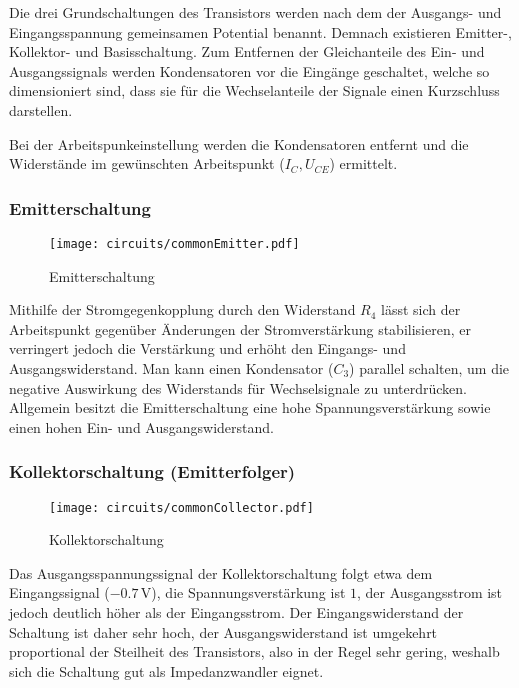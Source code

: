 Die drei Grundschaltungen des Transistors werden nach dem der Ausgangs- und
Eingangsspannung gemeinsamen Potential benannt. Demnach existieren Emitter-,
Kollektor- und Basisschaltung. Zum Entfernen der Gleichanteile des Ein- und
Ausgangssignals werden Kondensatoren vor die Eingänge geschaltet, welche so
dimensioniert sind, dass sie für die Wechselanteile der Signale einen
Kurzschluss darstellen.

Bei der Arbeitspunkeinstellung werden die Kondensatoren entfernt und die
Widerstände im gewünschten Arbeitspunkt ($I_C, U_{CE}$) ermittelt.

\subsubsection{Emitterschaltung}

\begin{figure}[H]
  \begin{center}
    \texttt{[image: circuits/commonEmitter.pdf]}
  \end{center}
  \caption{Emitterschaltung}
\end{figure}

Mithilfe der Stromgegenkopplung durch den Widerstand $R_4$ lässt sich der
Arbeitspunkt gegenüber Änderungen der Stromverstärkung stabilisieren, er
verringert jedoch die Verstärkung und erhöht den Eingangs- und Ausgangswiderstand.
Man kann einen Kondensator ($C_3$) parallel schalten, um die negative Auswirkung
des Widerstands für Wechselsignale zu unterdrücken. Allgemein besitzt die
Emitterschaltung eine hohe Spannungsverstärkung sowie einen hohen Ein- und
Ausgangswiderstand.

\subsubsection{Kollektorschaltung (Emitterfolger)}
\begin{figure}[H]
  \begin{center}
    \texttt{[image: circuits/commonCollector.pdf]}
  \end{center}
  \caption{Kollektorschaltung}
\end{figure}

Das Ausgangsspannungssignal der Kollektorschaltung folgt etwa dem Eingangssignal
($-0.7\,\si{\volt}$), die Spannungsverstärkung ist $1$, der Ausgangsstrom ist
jedoch deutlich höher als der Eingangsstrom. Der Eingangswiderstand
der Schaltung ist daher sehr hoch, der Ausgangswiderstand ist umgekehrt proportional
der Steilheit des Transistors, also in der Regel sehr gering, weshalb sich die
Schaltung gut als Impedanzwandler eignet. 

